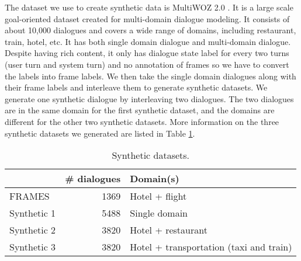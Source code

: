 The dataset we use to create synthetic data is MultiWOZ 2.0 \cite{budzianowski2018multiwoz}.
It is a large scale goal-oriented dataset created for multi-domain dialogue modeling. It consists of about 10,000 dialogues and covers a wide range of domains, including restaurant, train, hotel, etc. It has both single domain dialogue and multi-domain dialogue. Despite having rich content, it only has dialogue state label for every two turns (user turn and system turn) and no annotation of frames so we have to convert the labels into frame labels.
We then take the single domain dialogues along with their frame labels and interleave them to generate synthetic datasets.
We generate one synthetic dialogue by interleaving two dialogues. The two dialogues are in the same domain for the first synthetic dataset, and the domains are different for the other two synthetic datasets. More information on the three synthetic datasets we generated are listed in Table \ref{tab:syn}.


\begin{table}
    \centering
    \caption[Synthetic datasets]{Synthetic datasets.}
    \label{tab:syn}
    \begin{tabular}{lrl}
        \toprule
         & \# dialogues & Domain(s) \\
        \midrule
        FRAMES & 1369 & Hotel + flight \\
        Synthetic 1 & 5488 & Single domain \\
        Synthetic 2 & 3820 & Hotel + restaurant \\
        Synthetic 3 & 3820 & Hotel + transportation (taxi and train) \\
        \bottomrule
    \end{tabular}
\end{table}

